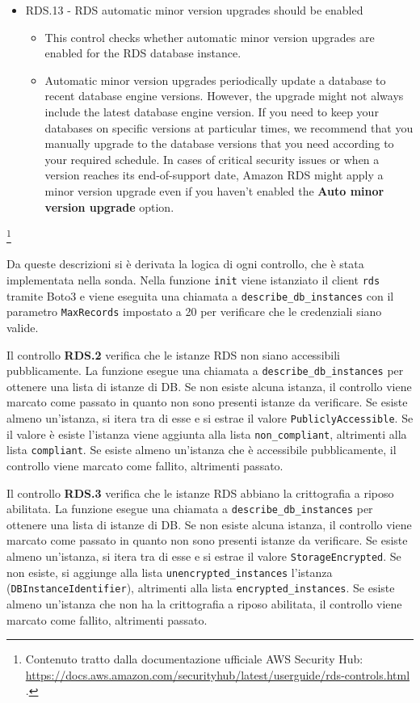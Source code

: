 \begin{mdframed}[backgroundcolor=gray!05, linecolor=gray!50]
\begin{itemize}
\begin{itemize}
    \end{itemize}
    \item RDS.13 - RDS automatic minor version upgrades should be enabled
    \begin{itemize}
        \item This control checks whether automatic minor version upgrades are enabled for the RDS database instance.
        \item Automatic minor version upgrades periodically update a database to recent database engine versions. However, the upgrade might not always include the latest database engine version. If you need to keep your databases on specific versions at particular times, we recommend that you manually upgrade to the database versions that you need according to your required schedule. In cases of critical security issues or when a version reaches its end-of-support date, Amazon RDS might apply a minor version upgrade even if you haven't enabled the \textbf{Auto minor version upgrade} option.
    \end{itemize}
\end{itemize}
\end{mdframed}
\footnote{Contenuto tratto dalla documentazione ufficiale AWS Security Hub: \url{https://docs.aws.amazon.com/securityhub/latest/userguide/rds-controls.html} .}

Da queste descrizioni si è derivata la logica di ogni controllo, che è stata implementata nella sonda. Nella funzione \texttt{init} viene istanziato il client \texttt{rds} tramite Boto3 e viene eseguita una chiamata a \texttt{describe\_db\_instances} con il parametro \texttt{MaxRecords} impostato a 20 per verificare che le credenziali siano valide.

Il controllo \textbf{RDS.2} verifica che le istanze RDS non siano accessibili pubblicamente. La funzione esegue una chiamata a \texttt{describe\_db\_instances} per ottenere una lista di istanze di DB. Se non esiste alcuna istanza, il controllo viene marcato come passato in quanto non sono presenti istanze da verificare. Se esiste almeno un'istanza, si itera tra di esse e si estrae il valore \texttt{PubliclyAccessible}. Se il valore è esiste l'istanza viene aggiunta alla lista \texttt{non\_compliant}, altrimenti alla lista \texttt{compliant}. Se esiste almeno un'istanza che è accessibile pubblicamente, il controllo viene marcato come fallito, altrimenti passato.

Il controllo \textbf{RDS.3} verifica che le istanze RDS abbiano la crittografia a riposo abilitata. La funzione esegue una chiamata a \texttt{describe\_db\_instances} per ottenere una lista di istanze di DB. Se non esiste alcuna istanza, il controllo viene marcato come passato in quanto non sono presenti istanze da verificare. Se esiste almeno un'istanza, si itera tra di esse e si estrae il valore \texttt{StorageEncrypted}. Se non esiste, si aggiunge alla lista \texttt{unencrypted\_instances} l'istanza (\texttt{DBInstanceIdentifier}), altrimenti alla lista \texttt{encrypted\_instances}. Se esiste almeno un'istanza che non ha la crittografia a riposo abilitata, il controllo viene marcato come fallito, altrimenti passato.

